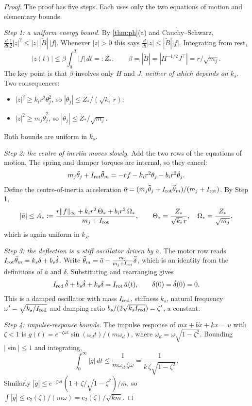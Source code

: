 \documentclass[11pt]{article}
\theoremstyle{definition}
\theoremstyle{remark}
\begin{document}
\begin{proof}
The proof has five steps. Each uses only the two equations of motion and elementary
bounds.

\emph{Step 1: a uniform energy bound.} By \cref{thm:ph}(a) and Cauchy--Schwarz,
$\frac{d}{dt}\frac12|z|^2\le|z|\,|\tilde B|\,|f|$. Whenever $|z|>0$ this says
$\frac{d}{dt}|z|\le|\tilde B||f|$. Integrating from rest,
\[
  |z(t)|\le\beta\int_0^T|f|\,dt=:Z_*,\qquad \beta=|\tilde B|=|H^{-1/2}J^\top|=r/\sqrt{m_j}.
\]
The key point is that $\beta$ involves only $H$ and $J$, \emph{neither of which depends on
$k_s$}. Two consequences:
\begin{itemize}[nosep]
  \item $|z|^2\ge k_ir^2\theta_j^2$, so $|\theta_j|\le Z_*/(\sqrt{k_i}\,r)$;
  \item $|z|^2\ge m_j\dot\theta_j^2$, so $|\dot\theta_j|\le Z_*/\sqrt{m_j}$.
\end{itemize}
Both bounds are uniform in $k_s$.

\emph{Step 2: the centre of inertia moves slowly.} Add the two rows of the equations of
motion. The spring and damper torques are internal, so they cancel:
\[
  m_j\ddot\theta_j+I_{\rm rot}\ddot\theta_m=-rf-k_ir^2\theta_j-b_ir^2\dot\theta_j .
\]
Define the centre-of-inertia acceleration
$\bar a=(m_j\ddot\theta_j+I_{\rm rot}\ddot\theta_m)/(m_j+I_{\rm rot})$. By Step 1,
\[
  |\bar a|\le A_*:=\frac{r\|f\|_\infty+k_ir^2\,\Theta_*+b_ir^2\,\Omega_*}{m_j+I_{\rm rot}},
  \qquad \Theta_*=\frac{Z_*}{\sqrt{k_i}\,r},\quad \Omega_*=\frac{Z_*}{\sqrt{m_j}},
\]
which is again uniform in $k_s$.

\emph{Step 3: the deflection is a stiff oscillator driven by $\bar a$.} The motor row reads
$I_{\rm rot}\ddot\theta_m=k_s\delta+b_s\dot\delta$. Write $\ddot\theta_m=\bar
a-\frac{m_j}{m_j+I_{\rm rot}}\ddot\delta$, which is an identity from the definitions of
$\bar a$ and $\delta$. Substituting and rearranging gives
\begin{equation}\label{eq:fast}
  I_{\rm red}\,\ddot\delta+b_s\dot\delta+k_s\delta=I_{\rm rot}\,\bar a(t),\qquad
  \delta(0)=\dot\delta(0)=0 .
\end{equation}
This is a damped oscillator with mass $I_{\rm red}$, stiffness $k_s$, natural frequency
$\omega'=\sqrt{k_s/I_{\rm red}}$ and damping ratio
$b_s/(2\sqrt{k_sI_{\rm red}})=\zeta'$, a constant.

\emph{Step 4: impulse-response bounds.} The impulse response of $m\ddot x+b\dot x+kx=u$
with $\zeta<1$ is $g(t)=e^{-\zeta\omega t}\sin(\omega_dt)/(m\omega_d)$, where
$\omega_d=\omega\sqrt{1-\zeta^2}$. Bounding $|\sin|\le1$ and integrating,
\[
  \int_0^\infty|g|\,dt\le\frac{1}{m\omega_d\,\zeta\omega}=\frac{1}{k\,\zeta\sqrt{1-\zeta^2}} .
\]
Similarly $|\dot g|\le e^{-\zeta\omega t}(1+\zeta/\sqrt{1-\zeta^2})/m$, so
$\int|\dot g|\le c_2(\zeta)/(m\omega)=c_2(\zeta)/\sqrt{km}$.


\end{proof}
\end{document}
